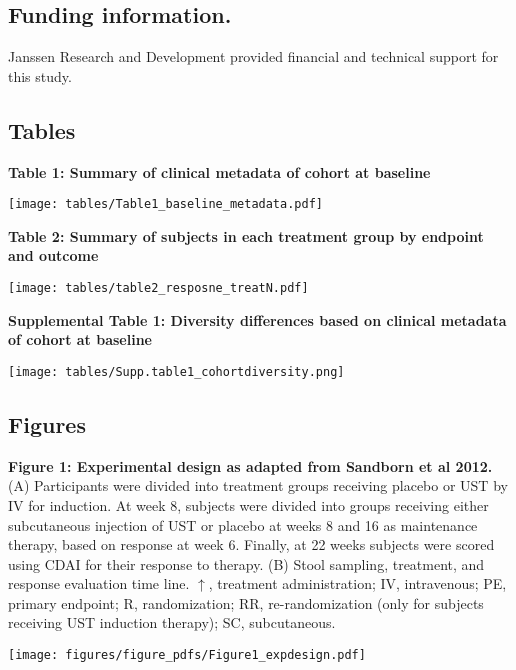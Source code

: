\documentclass[12pt,]{article}
\begin{document}
\subsection{Funding information.}\label{funding-information.}

Janssen Research and Development provided financial and technical
support for this study.

\newpage

\subsection{Tables}\label{tables}

\textbf{Table 1: Summary of clinical metadata of cohort at baseline}

\texttt{[image: tables/Table1\_baseline\_metadata.pdf]}

\newpage

\textbf{Table 2: Summary of subjects in each treatment group by endpoint
and outcome}

\texttt{[image: tables/table2\_resposne\_treatN.pdf]}

\newpage

\textbf{Supplemental Table 1: Diversity differences based on clinical
metadata of cohort at baseline}

\texttt{[image: tables/Supp.table1\_cohortdiversity.png]}

\newpage

\subsection{Figures}\label{figures}

\textbf{Figure 1: Experimental design as adapted from Sandborn et al
2012.} (A) Participants were divided into treatment groups receiving
placebo or UST by IV for induction. At week 8, subjects were divided
into groups receiving either subcutaneous injection of UST or placebo at
weeks 8 and 16 as maintenance therapy, based on response at week 6.
Finally, at 22 weeks subjects were scored using CDAI for their response
to therapy. (B) Stool sampling, treatment, and response evaluation time
line. \(\uparrow\), treatment administration; IV, intravenous; PE,
primary endpoint; R, randomization; RR, re-randomization (only for
subjects receiving UST induction therapy); SC, subcutaneous.

\texttt{[image: figures/figure\_pdfs/Figure1\_expdesign.pdf]}

\newpage
\end{document}
